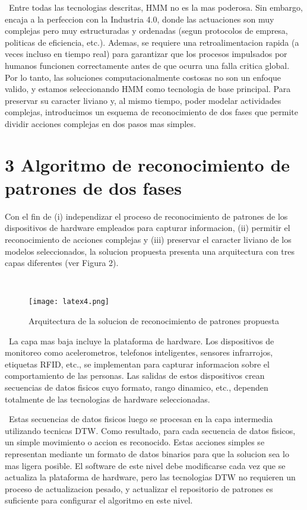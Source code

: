 \documentclass{paper}
\begin{document}
\ Entre todas las tecnologias descritas, HMM no es la mas poderosa. Sin embargo, encaja a la perfeccion con la Industria 4.0, donde las actuaciones son muy complejas pero muy estructuradas y ordenadas (segun protocolos de empresa, politicas de eficiencia, etc.). Ademas, se requiere una retroalimentacion rapida (a veces incluso en tiempo real) para garantizar que los procesos impulsados por humanos funcionen correctamente antes de que ocurra una falla critica global. Por lo tanto, las soluciones computacionalmente costosas no son un enfoque valido, y estamos seleccionando HMM como tecnologia de base principal. Para preservar su caracter liviano y, al mismo tiempo, poder modelar actividades complejas, introducimos un esquema de reconocimiento de dos fases que permite dividir acciones complejas en dos pasos mas simples.


\section*{3  Algoritmo de reconocimiento de patrones de dos fases}

Con el fin de (i) independizar el proceso de reconocimiento de patrones de los dispositivos de hardware empleados para capturar informacion, (ii) permitir el reconocimiento de acciones complejas y (iii) preservar el caracter liviano de los modelos seleccionados, la solucion propuesta presenta una arquitectura con tres capas diferentes (ver Figura 2).


\ \begin{figure}[H]
    \centering
    \texttt{[image: latex4.png]}
    \caption{Arquitectura de la solucion de reconocimiento de patrones propuesta}
    \label{fig:my_label}
\end{figure}


\ La capa mas baja incluye la plataforma de hardware. Los dispositivos de monitoreo como acelerometros, telefonos inteligentes, sensores infrarrojos, etiquetas RFID, etc., se implementan para capturar informacion sobre el comportamiento de las personas. Las salidas de estos dispositivos crean
secuencias de datos fisicos cuyo formato, rango dinamico, etc., dependen totalmente de las tecnologias de hardware seleccionadas.


\ Estas secuencias de datos fisicos luego se procesan en la capa intermedia utilizando tecnicas DTW. Como resultado, para cada secuencia de datos fisicos, un simple movimiento o accion es reconocido. Estas acciones simples se representan mediante un formato de datos binarios para que la solucion sea lo mas ligera posible. El software de este nivel debe modificarse cada
vez que se actualiza la plataforma de hardware, pero las tecnologias DTW no requieren un proceso de actualizacion pesado, y actualizar el repositorio de patrones es suficiente para configurar el algoritmo en este nivel.
\end{document}
